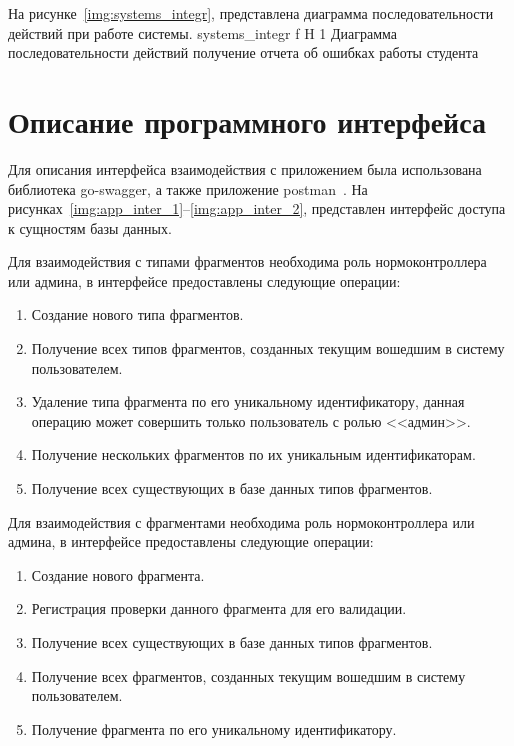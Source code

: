 На рисунке~\ref{img:systems_integr}, представлена диаграмма последовательности действий при работе системы.
{systems_integr} %
{f} %
{H} %
{1\textwidth} %
{Диаграмма последовательности действий получение отчета об ошибках работы студента} %

\section{Описание программного интерфейса}
Для описания интерфейса взаимодействия с приложением была использована библиотека go-swagger, а также приложение postman~\cite{go-swagger,postman}. На рисунках~\ref{img:app_inter_1}--\ref{img:app_inter_2}, представлен интерфейс доступа к сущностям базы данных.

Для взаимодействия с типами фрагментов необходима роль нормоконтроллера или админа, в интерфейсе предоставлены следующие операции:
\begin{enumerate}
	\item Создание нового типа фрагментов.
	\item Получение всех типов фрагментов, созданных текущим вошедшим в систему пользователем.
	\item Удаление типа фрагмента по его уникальному идентификатору, данная операцию может совершить только пользователь с ролью <<админ>>.
	\item Получение нескольких фрагментов по их уникальным идентификаторам.
	\item Получение всех существующих в базе данных типов фрагментов.
\end{enumerate}

Для взаимодействия с фрагментами необходима роль нормоконтроллера или админа, в интерфейсе предоставлены следующие операции:
\begin{enumerate}
	\item Создание нового фрагмента.
	\item Регистрация проверки данного фрагмента для его валидации.
	\item Получение всех существующих в базе данных типов фрагментов.
	\item Получение всех фрагментов, созданных текущим вошедшим в систему пользователем.
	\item Получение фрагмента по его уникальному идентификатору.
\end{enumerate}

